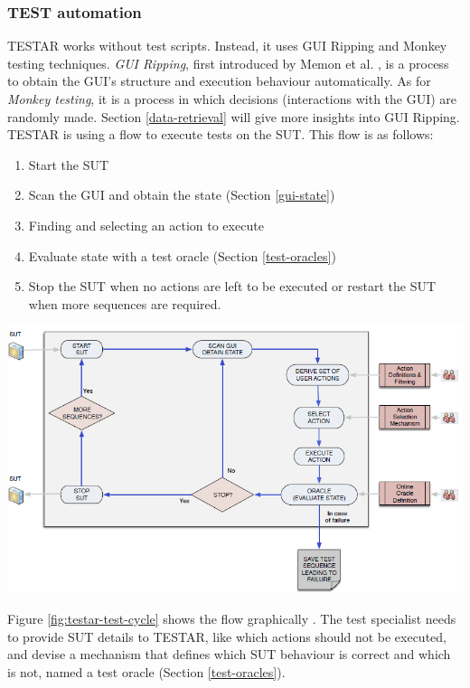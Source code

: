 \subsubsection{TEST automation} \label{testar-testauto}
TESTAR works without test scripts. Instead, it uses GUI Ripping and Monkey testing techniques. \emph{GUI Ripping}, first introduced by Memon et al. \cite{gui-ripping}, is a process to obtain the GUI's structure and execution behaviour automatically. As for \emph{Monkey testing}, it is a process in which decisions (interactions with the GUI) are randomly made. Section \ref{data-retrieval} will give more insights into GUI Ripping.
TESTAR is using a flow to execute tests on the SUT. This flow is as follows:
\begin{samepage}
\begin{enumerate}
    \item Start the SUT
    \item Scan the GUI and obtain the state (Section \ref{gui-state})
    \item Finding and selecting an action to execute
    \item Evaluate state with a test oracle (Section \ref{test-oracles})
    \item Stop the SUT when no actions are left to be executed or restart the SUT when more sequences are required.
\end{enumerate}
\end{samepage}

\bigskip
\begingroup
\captionsetup{type=figure}
\includegraphics[scale=0.75]{pics/testar-test-cycle.png}
\label{fig:testar-test-cycle}
\endgroup

Figure \ref{fig:testar-test-cycle} shows the flow graphically \cite{VosAho2021}. The test specialist needs to provide SUT details to TESTAR, like which actions should not be executed, and devise a mechanism that defines which SUT behaviour is correct and which is not, named a test oracle (Section \ref{test-oracles}). 

